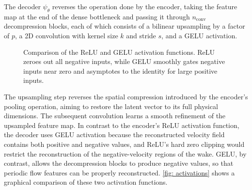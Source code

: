 The decoder $\psi_\theta$ reverses the operation done by the encoder, taking the feature map at the end of the dense bottleneck and passing it through $n_\text{conv}$ decompression blocks, each of which consists of a bilinear upsampling by a factor of $p$, a 2D convolution with kernel size $k$ and stride $s$, and a GELU activation. 

\begin{figure}[htbp]
    \centering
    \caption{Comparison of the ReLU and GELU activation functions. ReLU zeroes out all negative inputs, while GELU smoothly gates negative inputs near zero and asymptotes to the identity for large positive inputs.}
    \label{fig: activations}
\end{figure}

The upsampling step reverses the spatial compression introduced by the encoder's pooling operation, aiming to restore the latent vector to its full physical dimensions. The subsequent convolution learns a smooth refinement of the upsampled feature map. In contrast to the encoder's ReLU activation function, the decoder uses GELU activation because the reconstructed velocity field contains both positive and negative values, and ReLU's hard zero clipping would restrict the reconstruction of the negative-velocity regions of the wake. GELU, by contrast, allows the decompression blocks to produce negative values, so that periodic flow features can be properly reconstructed. \autoref{fig: activations} shows a graphical comparison of these two activation functions. 

